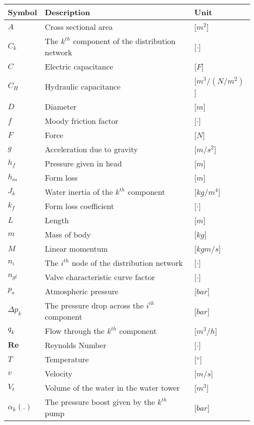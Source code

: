 \begin{tabular}{l l l} 
	\textbf{Symbol}	&	\textbf{Description}										& \textbf{Unit}	\\\hline
	$A$				&	Cross sectional area									    & [$m^2$]\\
	$C_k$			&	The $k^{th}$ component of the distribution network     		& [$\cdot$]\\
	$C$				&	Electric capacitance								   		& [$F$]\\
	$C_H$			&	Hydraulic capacitance								   		& [$m^3/(N/m^2)$]\\
	$D$				&	Diameter									     			& [$m$]\\
	$f$				&	Moody friction factor									    & [$\cdot$]\\
	$F$				&	Force									     				& [$N$]\\
	$g$				&	Acceleration due to gravity									& [$m/s^2$]\\
	$h_f$			&	Pressure given in head									    & [$m$]\\
	$h_m$			&	Form loss									    			& [$m$]\\
	$J_k$			&	Water inertia of the $k^{th}$ component						& [$kg/m^4$]\\
	$k_f$			&	Form loss coefficient								    	& [$\cdot$]\\
	$L$				&	Length									     				& [$m$]\\
	$m$				&	Mass of body									     		& [$kg$]\\
	$M$				&	Linear momentum									     		& [$kgm/s$]\\
	$n_i$			&	The $i^{th}$ node of the distribution network     			& [$\cdot$]\\
	$n_{gl}$		&	Valve characteristic curve factor							& [$\cdot$]\\
	$p_a$			&	Atmospheric pressure							      		& [$bar$]\\
	$\Delta p_k$	&	The pressure drop across the $i^{th}$ component      		& [$bar$]\\
	$q_k$			&	Flow through the $k^{th}$ component 		     			& [$m^3/h$]\\
	$\pmb{Re}$		&	Reynolds Number								     			& [$\cdot$]\\
	$T$				&	Temperature									     			& [$\degree$]\\
	$v$				&	Velocity									     			& [$m/s$]\\
	$V_t$			&	Volume of the water in the water tower						& [$m^3$]\\
	$\alpha_k(.)$	&	The pressure boost given by the	$k^{th}$ pump				& [$bar$]\\

\end{tabular}
